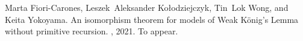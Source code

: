 Marta Fiori-Carones, Leszek~Aleksander Ko{\l}odziejczyk, Tin~Lok Wong, and
  Keita Yokoyama.
\newblock An isomorphism theorem for models of {W}eak {K}\"onig's {L}emma
  without primitive recursion.
, 2021.
\newblock To appear.

